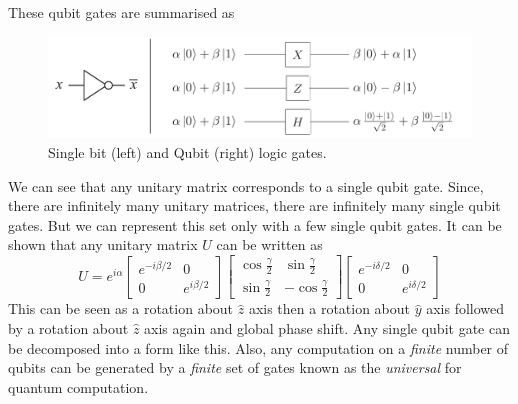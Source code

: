 These qubit gates are summarised as
\begin{figure}[H]
    \centering
    \includegraphics[width=\textwidth]{images/qubit_gates.png}
    \caption{Single bit (left) and Qubit (right) logic gates.}
    \label{fig:qubit_gates}
\end{figure}
We can see that any unitary matrix corresponds to a single qubit gate. Since, there are infinitely many unitary matrices, there are infinitely many single qubit gates. But we can represent this set only with a few single qubit gates. It can be shown that any unitary matrix  $U$ can be written as
\begin{equation}
    U = e^{i\alpha}\begin{bmatrix}
        e^{-i\beta/2} & 0 \\ 0 & e^{i\beta/2}
    \end{bmatrix}
    \begin{bmatrix}
        \cos{\frac{\gamma}{2}} & \sin{\frac{\gamma}{2}} \\ \sin{\frac{\gamma}{2}} & -\cos{\frac{\gamma}{2}}
    \end{bmatrix}
    \begin{bmatrix}
        e^{-i\delta/2} & 0 \\ 0 & e^{i\delta/2}
    \end{bmatrix}
\end{equation}
This can be seen as a rotation about $\hat{z}$ axis then a rotation about $\hat{y}$ axis followed by a rotation about $\hat{z}$ axis again and global phase shift. Any single qubit gate can be decomposed into a form like this. Also, any computation on a \textit{finite} number of qubits can be generated by a \textit{finite} set of gates known as the \textit{universal} for quantum computation.

